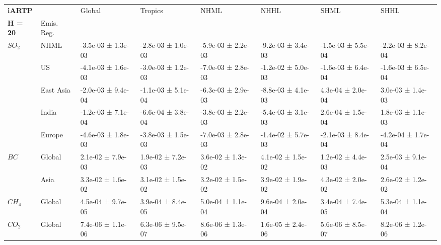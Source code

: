 \documentclass[preview]{standalone}
\newcommand{\nm}{\phantom{-}}
\begin{document}
	\tiny
	\begin{minipage}{\textwidth}
		\setlength\tabcolsep{5pt}
		\begin{tabular}{llllllll}
			\toprule
			\textbf{iARTP}  &      &               Global  &              Tropics &                 NHML &                 NHHL &                 SHML &                 SHHL \\
			\textbf{H = 20}      & Emis. Reg. &                      &                      &                      &                      &                      &                      \\
			\midrule
$SO_2$ & NHML &  -3.5e-03 ±  1.3e-03 &  -2.8e-03 ±  1.0e-03 &  -5.9e-03 ±  2.2e-03 &  -9.2e-03 ±  3.4e-03 &  -1.5e-03 ±  5.5e-04 &  -2.2e-03 ±  8.2e-04 \\
       & US &  -4.1e-03 ±  1.6e-03 &  -3.0e-03 ±  1.2e-03 &  -7.0e-03 ±  2.8e-03 &  -1.2e-02 ±  5.0e-03 &  -1.6e-03 ±  6.4e-04 &  -1.6e-03 ±  6.5e-04 \\
       & East Asia &  -2.0e-03 ±  9.4e-04 &  -1.1e-03 ±  5.1e-04 &  -6.3e-03 ±  2.9e-03 &  -8.8e-03 ±  4.1e-03 &   \nm4.3e-04 ±  2.0e-04 &   \nm3.0e-03 ±  1.4e-03 \\
       & India &  -1.2e-03 ±  7.1e-04 &  -6.6e-04 ±  3.8e-04 &  -3.8e-03 ±  2.2e-03 &  -5.4e-03 ±  3.1e-03 &   \nm2.6e-04 ±  1.5e-04 &   \nm1.8e-03 ±  1.1e-03 \\
       & Europe &  -4.6e-03 ±  1.8e-03 &  -3.8e-03 ±  1.5e-03 &  -7.0e-03 ±  2.8e-03 &  -1.4e-02 ±  5.7e-03 &  -2.1e-03 ±  8.4e-04 &  -4.2e-04 ±  1.7e-04 \\
\cmidrule(lr){1-8}
$BC$& Global &   \nm2.1e-02 ±  7.9e-03 &   \nm1.9e-02 ±  7.2e-03 &   \nm3.6e-02 ±  1.3e-02 &   \nm4.1e-02 ±  1.5e-02 &   \nm1.2e-02 ±  4.4e-03 &   \nm2.5e-03 ±  9.1e-04 \\
       & Asia &   \nm3.3e-02 ±  1.6e-02 &   \nm3.1e-02 ±  1.5e-02 &   \nm3.2e-02 ±  1.5e-02 &   \nm3.9e-02 ±  1.9e-02 &   \nm4.3e-02 ±  2.0e-02 &   \nm2.6e-02 ±  1.2e-02 \\
\cmidrule(lr){1-8}
$CH_4$ & Global &   \nm4.5e-04 ±  9.7e-05 &   \nm3.9e-04 ±  8.4e-05 &   \nm5.0e-04 ±  1.1e-04 &   \nm9.6e-04 ±  2.0e-04 &   \nm3.4e-04 ±  7.4e-05 &   \nm5.3e-04 ±  1.1e-04 \\
\cmidrule(lr){1-8}
$CO_2$ & Global &   \nm7.4e-06 ±  1.1e-06 &   \nm6.3e-06 ±  9.5e-07 &   \nm8.6e-06 ±  1.3e-06 &   \nm1.6e-05 ±  2.4e-06 &  \nm 5.6e-06 ±  8.5e-07 &   \nm8.2e-06 ±  1.2e-06 \\
\bottomrule
\end{tabular}

        \end{minipage}
        
\end{document}
